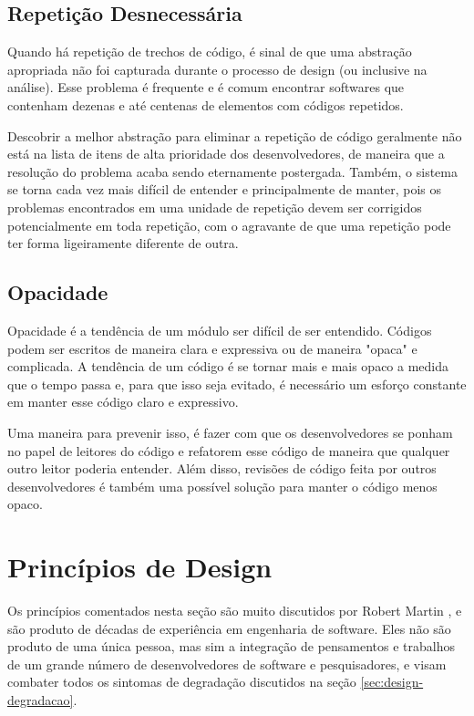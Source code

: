 \subsection{Repetição Desnecessária}

Quando há repetição de trechos de código, é sinal de que uma abstração
apropriada não foi capturada durante o processo de design (ou inclusive na
análise). Esse problema é frequente e é comum encontrar softwares que contenham 
dezenas e até centenas de elementos com códigos repetidos. 

Descobrir a melhor abstração para eliminar a repetição de código geralmente não 
está na lista de itens de alta prioridade dos desenvolvedores, de maneira que a 
resolução do problema acaba sendo eternamente postergada. Também, o sistema se
torna cada vez mais difícil de entender e principalmente de manter, pois os 
problemas encontrados em uma unidade de repetição devem ser corrigidos
potencialmente  em toda repetição, com o agravante de que uma repetição pode
ter forma ligeiramente diferente de outra.

\subsection{Opacidade}

Opacidade é a tendência de um módulo ser difícil de ser entendido. Códigos podem
ser escritos de maneira clara e expressiva ou de maneira "opaca" e complicada. A
tendência de um código é se tornar mais e mais opaco a medida que o tempo passa
e, para que isso seja evitado, é necessário um esforço constante em manter esse 
código claro e expressivo. 

Uma maneira para prevenir isso, é fazer com que os  desenvolvedores se ponham no
papel de leitores do código e refatorem esse código de maneira que qualquer
outro  leitor poderia entender. Além disso, revisões de código feita por outros
desenvolvedores é também uma possível solução para manter o código menos opaco.

\section{Princípios de Design}
\label{sec:design-oo-principios}

Os princípios comentados nesta seção são muito discutidos por Robert Martin \cite{bob-martin}, e são produto de 
décadas de experiência em engenharia de software.
Eles não são produto de uma única pessoa, mas sim a integração de pensamentos e trabalhos de um grande número de
desenvolvedores de software e pesquisadores, e visam combater todos os sintomas de degradação discutidos na seção \ref{sec:design-degradacao}.

